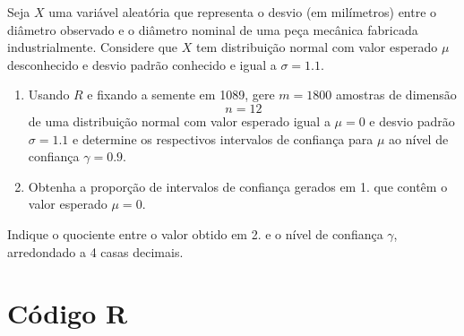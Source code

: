 \documentclass[11pt,a4paper]{article}
\begin{document}
\begin{tcolorbox}[colback=blue!5!white,colframe=blue!75!black,title=Intervalos de Confiança - Exercício 8]

Seja \( X \) uma variável aleatória que representa o desvio (em milímetros) entre o diâmetro observado e o diâmetro nominal de uma peça mecânica fabricada industrialmente.  
Considere que \( X \) tem distribuição normal com valor esperado \( \mu \) desconhecido e desvio padrão conhecido e igual a \( \sigma = 1.1 \).  

\begin{enumerate}
    \item Usando \( R \) e fixando a semente em 1089, gere \( m = 1800 \) amostras de dimensão  
    \[    
    n = 12
    \]  
    de uma distribuição normal com valor esperado igual a \( \mu = 0 \) e desvio padrão \( \sigma = 1.1 \) e determine os respectivos intervalos de confiança para \( \mu \) ao nível de confiança \( \gamma = 0.9 \).  
    
    \item Obtenha a proporção de intervalos de confiança gerados em 1. que contêm o valor esperado \( \mu = 0 \).  
\end{enumerate}

Indique o quociente entre o valor obtido em 2. e o nível de confiança \( \gamma \), arredondado a 4 casas decimais.

\end{tcolorbox}

\section*{Código R}
\end{document}
